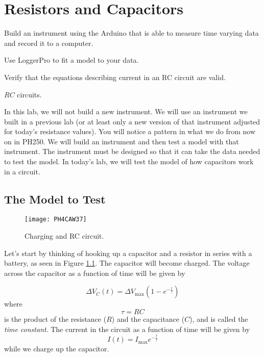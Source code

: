 
\chapter{Resistors and Capacitors}
\objectives
{
\item Build an instrument using the Arduino that is able to measure
	time varying data and record it to a computer.
\item Use LoggerPro to fit a model to your data.
\item Verify that the equations describing current in an RC circuit are valid.
}

\review
{
\item $RC$ circuits.
}

In this lab, we will not build a new instrument. We will use an instrument
we built in a previous lab (or at least only a new version of that
instrument adjusted for today's resistance values). You will notice a
pattern in what we do from now on in PH250. We will build an instrument and
then test a model with that instrument. The instrument must be designed so
that it can take the data needed to test the model. In today's lab, we will
test the model of how capacitors work in a circuit.

\section{The Model to Test}

\begin{figure}[htbp!]
	\centering
\texttt{[image: PH4CAW37]}
	\caption{Charging and RC circuit.}
	\label{fig:rc_charge}
\end{figure}

Let's start by thinking of hooking up a capacitor and a resistor in series
with a battery, as seen in Figure \ref{fig:rc_charge}. 
The capacitor will become charged. The voltage across the
capacitor as a function of time will be given by

\begin{equation*}
\Delta V_{C}\left( t\right) =\Delta V_{\max }\left( 1-e^{-\frac{t}{\tau }%
}\right)%
\end{equation*}%
where 
\begin{equation}
\tau =RC
\end{equation}%
is the product of the resistance ($R$) and the capacitance ($C$), and 
is called the \emph{time constant}. The current
in the circuit as a function of time will be given by%
\begin{equation*}
I\left( t\right) =I_{\max }e^{-\frac{t}{\tau }}%
\end{equation*}%
while we charge up the capacitor. 


